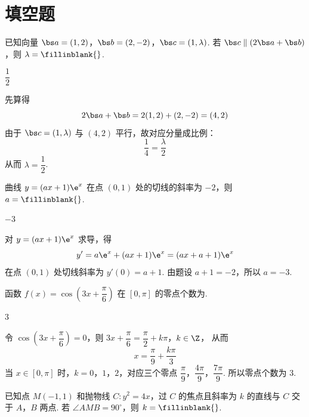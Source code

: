 \section{填空题}

\begin{problem}
已知向量 \(\bs a=(1,2)\)，\(\bs b=(2,-2)\)，\(\bs c=(1,\lambda)\). 若 \(\bs c\parallel (2\bs a+\bs b)\)，则 \(\lambda=\fillinblank{}\).
\end{problem}

\begin{answer}
\(\dfrac12\)
\end{answer}

\begin{solution}
先算得
\[
2\bs a+\bs b=2(1,2)+(2,-2)=(4,2)
\]
由于 \(\bs c=(1,\lambda)\) 与 \((4,2)\) 平行，故对应分量成比例：
\[
\dfrac{1}{4}=\dfrac{\lambda}{2}
\]
从而 \(\lambda=\dfrac12\).
\end{solution}

\begin{problem}
曲线 \(y=(ax+1)\e^x\) 在点 \((0,1)\) 处的切线的斜率为 \(-2\)，则 \(a=\fillinblank{}\).
\end{problem}

\begin{answer}
\(-3\)
\end{answer}

\begin{solution}
对 \(y=(ax+1)\e^x\) 求导，得
\[
y'=a\e^x+(ax+1)\e^x=(ax+a+1)\e^x
\]
在点 \((0,1)\) 处切线斜率为 \(y'(0)=a+1\). 由题设 \(a+1=-2\)，所以 \(a=-3\).
\end{solution}

\begin{problem}
函数 \(f(x)=\cos\!\left(3x+\dfrac{\pi}{6}\right)\) 在 \([0,\pi]\) 的零点个数为\fillinblank{}.
\end{problem}

\begin{answer}
\(3\)
\end{answer}

\begin{solution}
令 \(\cos\left(3x+\dfrac\pi6\right)=0\)，则
\(3x+\dfrac\pi6=\dfrac\pi2+k\pi\)，\(k\in\Z\)，
从而
\[
x=\dfrac\pi9+\dfrac{k\pi}{3}
\]
当 \(x\in[0,\pi]\) 时，\(k=0\)，\(1\)，\(2\)，对应三个零点
\(\dfrac\pi9\)，\(\dfrac{4\pi}{9}\)，\(\dfrac{7\pi}{9}\).
所以零点个数为 \(3\).
\end{solution}

\begin{problem}
已知点 \(M(-1,1)\) 和抛物线 \(C:y^2=4x\)，过 \(C\) 的焦点且斜率为 \(k\) 的直线与 \(C\) 交于 \(A\)，\(B\) 两点. 若 \(\angle AMB=90^\circ\)，则 \(k=\fillinblank{}\).
\end{problem}

